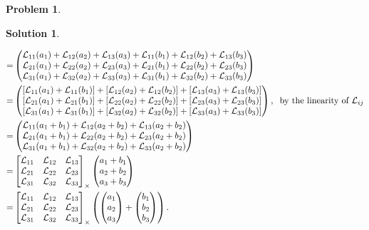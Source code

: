 \documentclass{article}
\theoremstyle{definition}
\newtheorem*{prob*}{Problem}
\newtheorem*{sln*}{Solution}
\newcommand{\lag}{\mathcal{L}}
\begin{document}
\begin{prob*}
\begin{sln*}
\begin{enumerate}
\begin{enumerate}
\begin{align*}
			=
			& \begin{pmatrix}
			\lag_{11}(a_1) + \lag_{12}(a_2) + \lag_{13}(a_3) + \lag_{11}(b_1) + \lag_{12}(b_2) + \lag_{13}(b_3)\\
			\lag_{21}(a_1) + \lag_{22}(a_2) + \lag_{23}(a_3) + \lag_{21}(b_1) + \lag_{22}(b_2) + \lag_{23}(b_3)\\
			\lag_{31}(a_1) + \lag_{32}(a_2) + \lag_{33}(a_3) + \lag_{31}(b_1) + \lag_{32}(b_2) + \lag_{33}(b_3)
			\end{pmatrix}\\
			=
			& \begin{pmatrix}
			[\lag_{11}(a_1) + \lag_{11}(b_1)] + [\lag_{12}(a_2) + \lag_{12}(b_2)] + [\lag_{13}(a_3) + \lag_{13}(b_3)]\\
			[\lag_{21}(a_1) + \lag_{21}(b_1)] + [\lag_{22}(a_2) + \lag_{22}(b_2)] + [\lag_{23}(a_3) + \lag_{23}(b_3)]\\
			[\lag_{31}(a_1) + \lag_{31}(b_1)] + [\lag_{32}(a_2) + \lag_{32}(b_2)] + [\lag_{33}(a_3) + \lag_{33}(b_3)]
			\end{pmatrix}, \hspace{0.2cm} \text{by the linearity of $\lag_{ij}$}\\
			=
			& \begin{pmatrix}
			\lag_{11}(a_1 + b_1) + \lag_{12}(a_2 + b_2) + \lag_{13}(a_2 + b_2)\\
			\lag_{21}(a_1 + b_1) + \lag_{22}(a_2 + b_2) + \lag_{23}(a_2 + b_2)\\
			\lag_{31}(a_1 + b_1) + \lag_{32}(a_2 + b_2) + \lag_{33}(a_2 + b_2)
			\end{pmatrix}\\
			=
			& \begin{bmatrix}
			\lag_{11} & \lag_{12} & \lag_{13}\\
			\lag_{21} & \lag_{22} & \lag_{23}\\
			\lag_{31} & \lag_{32} & \lag_{33}
			\end{bmatrix}_\times 
			\begin{pmatrix}
			a_1 + b_1\\a_2 + b_2\\a_3 + b_3
			\end{pmatrix}\\
			=
			& \begin{bmatrix}
			\lag_{11} & \lag_{12} & \lag_{13}\\
			\lag_{21} & \lag_{22} & \lag_{23}\\
			\lag_{31} & \lag_{32} & \lag_{33}
			\end{bmatrix}_\times
			\left( 
			\begin{pmatrix}
			a_1\\a_2\\a_3
			\end{pmatrix}
			+
			\begin{pmatrix}
			b_1\\b_2\\b_3
			\end{pmatrix}
			\right).
			\end{align*}  
			

\end{enumerate}
\end{enumerate}
\end{sln*}
\end{prob*}
\end{document}
